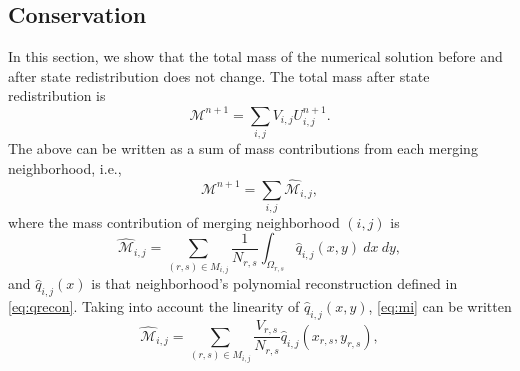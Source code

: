 \subsection{Conservation}\label{sec:cons}
In this section, we show that the total mass of the numerical solution before and after state redistribution does not change.  The total mass after state redistribution is 
\begin{equation}\label{eq:total_mass}
\mathcal{M}^{n+1} = \sum_{i,j} V_{i,j} U^{n+1}_{i,j}.
\end{equation}
The above can be written as a sum of mass contributions from each merging neighborhood, i.e.,
\begin{equation}\label{eq:total_mass2}
\mathcal{M}^{n+1} = \sum_{i,j} \widehat{\mathcal{M}}_{i,j},
\end{equation}
where the mass contribution of merging neighborhood $(i,j)$ is
\begin{equation}\label{eq:mi}
\widehat{\mathcal{M}}_{i,j} = \sum_{(r,s) \in M_{i,j}}\frac{1}{N_{r,s}} \int_{\Omega_{r,s}}\widehat q_{i,j}(x,y) ~dx~dy,
\end{equation}
and $\widehat q_{i,j}(x)$ is that neighborhood's polynomial reconstruction defined in \eqref{eq:qrecon}.  Taking into account the linearity of $\widehat{q}_{i,j}(x,y)$, \eqref{eq:mi} can be written
 \begin{equation}\label{eq:mi_lin}
 \widehat{\mathcal{M}}_{i,j} = \sum_{(r,s) \in M_{i,j}}\frac{V_{r,s}}{N_{r,s}} \widehat q_{i,j}(x_{r,s},y_{r,s}),
 \end{equation}

